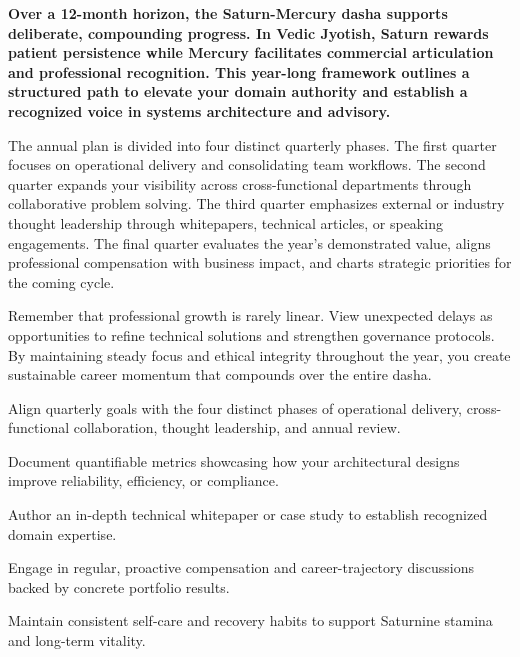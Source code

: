 {\fontsize{9.5}{13.8}\selectfont\bfseries\color{DeepSlate} Over a 12-month horizon, the Saturn-Mercury dasha supports deliberate, compounding progress. In Vedic Jyotish, Saturn rewards patient persistence while Mercury facilitates commercial articulation and professional recognition. This year-long framework outlines a structured path to elevate your domain authority and establish a recognized voice in systems architecture and advisory.}\par\vspace{2mm}

{\fontsize{9}{13}\selectfont The annual plan is divided into four distinct quarterly phases. The first quarter focuses on operational delivery and consolidating team workflows. The second quarter expands your visibility across cross-functional departments through collaborative problem solving. The third quarter emphasizes external or industry thought leadership through whitepapers, technical articles, or speaking engagements. The final quarter evaluates the year's demonstrated value, aligns professional compensation with business impact, and charts strategic priorities for the coming cycle.}\par\vspace{1.8mm}

{\fontsize{9}{13}\selectfont Remember that professional growth is rarely linear. View unexpected delays as opportunities to refine technical solutions and strengthen governance protocols. By maintaining steady focus and ethical integrity throughout the year, you create sustainable career momentum that compounds over the entire dasha.}\par\vspace{1.8mm}

\begin{diamondlist}
  \item {\fontsize{8.5}{12}\selectfont Align quarterly goals with the four distinct phases of operational delivery, cross-functional collaboration, thought leadership, and annual review.}
  \item {\fontsize{8.5}{12}\selectfont Document quantifiable metrics showcasing how your architectural designs improve reliability, efficiency, or compliance.}
  \item {\fontsize{8.5}{12}\selectfont Author an in-depth technical whitepaper or case study to establish recognized domain expertise.}
  \item {\fontsize{8.5}{12}\selectfont Engage in regular, proactive compensation and career-trajectory discussions backed by concrete portfolio results.}
  \item {\fontsize{8.5}{12}\selectfont Maintain consistent self-care and recovery habits to support Saturnine stamina and long-term vitality.}
\end{diamondlist}

